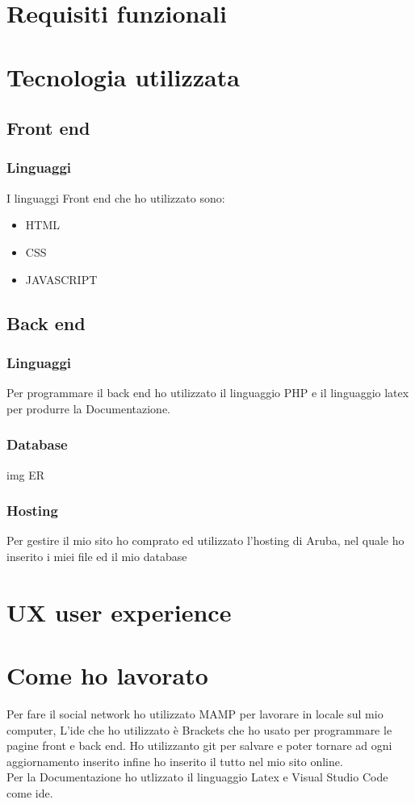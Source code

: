 \documentclass{article}
\begin{document}
\section{Requisiti funzionali}

    \section{Tecnologia utilizzata}
    \subsection{Front end}
    \subsubsection{Linguaggi}
 I linguaggi Front end che ho utilizzato sono:
 \begin{itemize}
    \item HTML 
    \item CSS 
    \item JAVASCRIPT 
  \end{itemize}
    \subsection{Back end}
    \subsubsection{Linguaggi}
Per programmare il back end ho utilizzato il linguaggio PHP e il linguaggio latex per produrre la Documentazione.
    \subsubsection{Database}
    img ER 
    \subsubsection{}


    \subsubsection{Hosting}
Per gestire il mio sito ho comprato ed utilizzato l'hosting di Aruba, nel quale ho inserito i miei file ed il mio database 
    \section{UX user experience}


    \section{Come ho lavorato}

Per fare il social network ho utilizzato MAMP per lavorare in locale sul mio computer, L'ide che ho utilizzato è Brackets che ho usato per programmare le pagine front e back end. Ho utilizzanto git per salvare e poter tornare ad ogni aggiornamento inserito infine ho inserito il tutto nel mio sito online. \\
Per la Documentazione ho utlizzato il linguaggio Latex e Visual Studio Code come ide.
    

    
    
    
\end{document}
